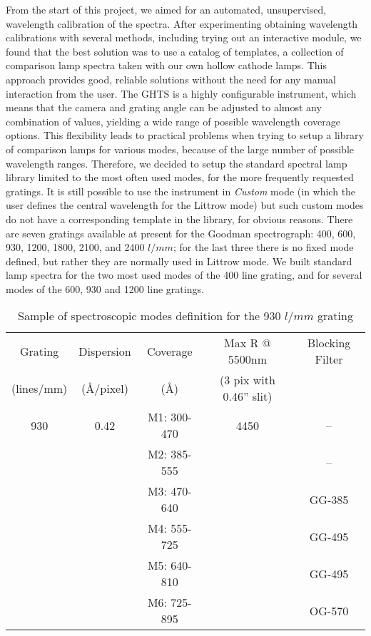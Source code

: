 \documentclass[11pt,twoside]{article}
\begin{document}
From the start of this project, we aimed for an automated, unsupervised, wavelength calibration of the spectra. After experimenting obtaining wavelength calibrations with several methods, including trying out an interactive module, we found that the best solution was to use a catalog of templates, a collection of comparison lamp spectra taken with our own hollow cathode lamps. This approach provides good, reliable solutions without the need for any manual interaction from the user. The GHTS is a highly configurable instrument, which means that the camera and grating angle can be adjusted to almost any combination of values, yielding a wide range of possible wavelength coverage options. This flexibility leads to practical problems when trying to setup a library of comparison lamps for various modes, because of the large number of possible wavelength ranges.  Therefore, we decided to setup the standard spectral lamp library limited to the most often used modes, for the more frequently requested gratings. It is still possible to use the instrument in \emph{Custom} mode (in which the user defines the central wavelength for the Littrow mode) but such custom modes do not have a corresponding template in the library, for obvious reasons. 
There are seven gratings available at present for the Goodman spectrograph: 400, 600, 930, 1200, 1800, 2100, and 2400 $l/mm$; for the last three there is no fixed mode defined, but rather they are normally used in Littrow mode. We built standard lamp spectra for the two most used modes of the 400 line grating, and for several modes of the 600, 930 and 1200 line gratings.

\begin{table}[!ht]
\caption{Sample of spectroscopic modes definition for the 930 $l/mm$ grating}
\begin{tabular}{|c|c|c|c|c|}
\hline
    Grating  & Dispersion & Coverage& Max R @ 5500nm & Blocking Filter \\
    (lines/mm) & (\AA/pixel)  &  (\AA)  & (3 pix with 0.46'' slit) & \\
\hline
    930 & 0.42 & M1: 300-470& 4450 & -- \\
    & & M2: 385-555 & & -- \\
    & & M3: 470-640 & & GG-385\\
    & & M4: 555-725 & & GG-495\\
    & & M5: 640-810 & & GG-495\\
    & & M6: 725-895 & & OG-570\\
\hline
\end{tabular}
\end{table}
\end{document}
